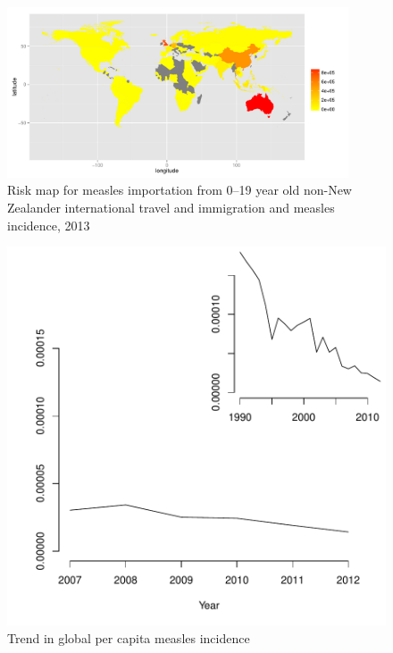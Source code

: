 \documentclass{article}
\begin{document}
\begin{figure}
\begin{center}
     \includegraphics[width=0.9\textwidth]{2013np4.pdf}
\end{center}
\caption{Risk map for measles importation from 0--19 year old non-New Zealander international travel and immigration and measles incidence, 2013}
\label{fig:imrisk12}
\end{figure}

\begin{figure}
\begin{center}
\includegraphics{draftfinalreport_v3-017}
\end{center}
\caption{Trend in global per capita measles incidence}
\label{fig:trendincidence}
\end{figure}
\end{document}
